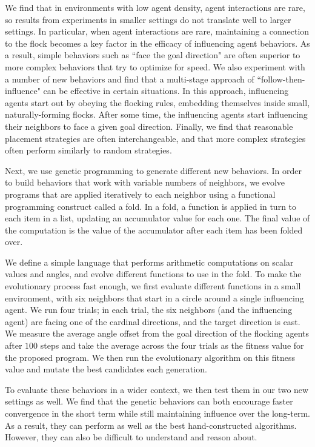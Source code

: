 We find that in environments with low agent density, agent interactions are rare,
so results from experiments in smaller settings do not translate well to larger
settings.
In particular, when agent interactions are rare, maintaining a connection to
the flock becomes a key factor in the efficacy of influencing agent behaviors.
As a result, simple behaviors such as ``face the goal direction" are
often superior to more complex behaviors that try to optimize for speed.
We also experiment with a number of new behaviors and find that a multi-stage 
approach of ``follow-then-influence" can be effective in certain 
situations.
In this approach, influencing agents start out by obeying the flocking rules,
embedding themselves inside small, naturally-forming flocks.
After some time, the influencing agents start influencing their neighbors to
face a given goal direction.
Finally, we find that reasonable placement strategies are often 
interchangeable, and that more complex strategies often perform similarly to 
random strategies.

Next, we use genetic programming to generate different new behaviors.
In order to build behaviors that work with variable numbers of neighbors, we
evolve programs that are applied iteratively to each neighbor using
a functional programming construct called a fold.
In a fold, a function is applied in turn to each item in a list, updating an
accumulator value for each one.
The final value of the computation is the value of the accumulator after each
item has been folded over.

We define a simple language that performs arithmetic computations
on scalar values and angles, and evolve different functions to use in the fold.
To make the evolutionary process fast enough, we first evaluate different
functions in a small environment, with six neighbors that start in a circle
around a single influencing agent.
We run four trials; in each trial, the six neighbors (and the influencing agent)
are facing one of the cardinal directions, and the target direction is east.
We measure the average angle offset from the goal direction of the flocking
agents after $100$ steps and take the average across the four trials as the
fitness value for the proposed program.
We then run the evolutionary algorithm on this fitness value and mutate the
best candidates each generation.

To evaluate these behaviors in a wider context, we then test them in our two
new settings as well.
We find that the genetic behaviors can both encourage faster convergence in the
short term while still maintaining influence over the long-term.
As a result, they can perform as well as the best hand-constructed algorithms.
However, they can also be difficult to understand and reason about.

